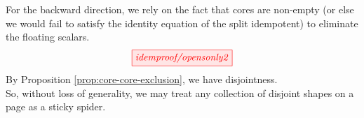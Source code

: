 \begin{myboxR}
For the backward direction, we rely on the fact that cores are non-empty (or else we would fail to satisfy the identity equation of the split idempotent) to eliminate the floating scalars.
\[\scalebox{1}{\tikzfig{idemproof/opensonly2}}\]
By Proposition \ref{prop:core-core-exclusion}, we have disjointness.\\

So, without loss of generality, we may treat any collection of disjoint shapes on a page as a sticky spider.
\end{myboxR}

\clearpage